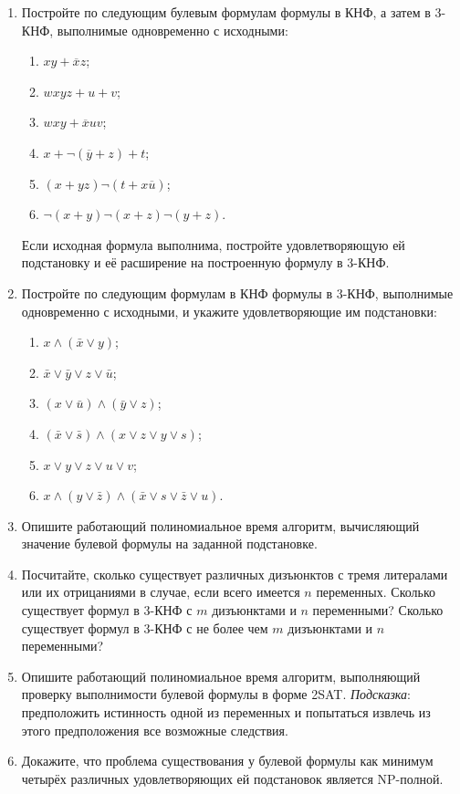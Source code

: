 \documentclass[12pt,a4paper]{article}
\begin{document}
\begin{enumerate}[itemsep=5pt]
\item Постройте по следующим булевым формулам формулы в КНФ, а затем в 3-КНФ, выполнимые одновременно с исходными:
  \begin{multicols}{2}
  \begin{enumerate}
  \item $xy+\overline{x}z$;
  \item $wxyz+u+v$;
  \item $wxy+\overline x uv$;
  \item $x+\neg (\overline y + z) +t$;
  \item $(x+ yz)\neg(t+x\overline u)$;
  \item $\neg(x+y)\neg(x+z)\neg(y+z)$.
  \end{enumerate}
  \end{multicols}
Если исходная формула выполнима, постройте удовлетворяющую ей подстановку и её расширение на построенную формулу в 3-КНФ.
  
\item Постройте по следующим формулам в КНФ формулы в 3-КНФ, выполнимые одновременно с исходными,
и укажите удовлетворяющие им подстановки:
\begin{multicols}{2}
\begin{enumerate}[topsep=0mm]
\item $x\wedge(\bar x\vee y)$;
\item $\bar x\vee \bar y \vee z \vee \bar u$;
\item $(x\vee \bar u)\wedge(\bar y\vee z)$;
\item $(\bar x\vee \bar s)\wedge(x\vee z\vee y\vee s)$;
\item $x\vee y \vee z \vee u \vee v$;
\item $x\wedge (y\vee \bar z) \wedge (\bar x\vee s \vee \bar z \vee u)$.
\end{enumerate}
\end{multicols}
\vspace{-3mm}

\item Опишите работающий полиномиальное время алгоритм, вычисляющий
значение булевой формулы на заданной подстановке.

\item Посчитайте, сколько существует различных дизъюнктов с тремя литералами или их отрицаниями
в случае, если всего имеется $n$ переменных. Сколько существует формул в 3-КНФ с $m$ дизъюнктами
и $n$ переменными? Сколько существует формул в 3-КНФ с не более чем $m$ дизъюнктами
и $n$ переменными? 

\item Опишите работающий полиномиальное время алгоритм, выполняющий проверку выполнимости
булевой формулы в форме 2SAT. \textit{Подсказка}: предположить истинность 
одной из переменных и попытаться извлечь из этого предположения все возможные следствия.

\item Докажите, что проблема существования у булевой формулы как минимум четырёх
различных удовлетворяющих ей подстановок является NP-полной.

\end{enumerate}
\end{document}
